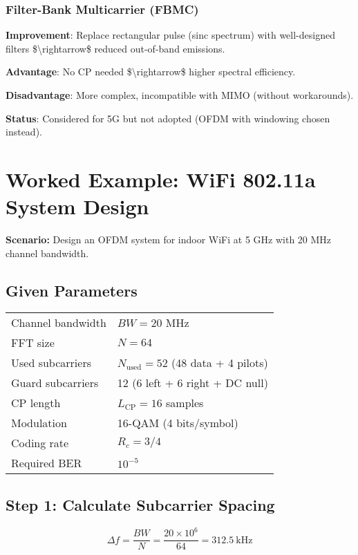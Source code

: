 \subsubsection{Filter-Bank Multicarrier
(FBMC)}\label{filter-bank-multicarrier-fbmc}

\textbf{Improvement}: Replace rectangular pulse (sinc spectrum) with
well-designed filters \$\textbackslash rightarrow\$ reduced out-of-band
emissions.

\textbf{Advantage}: No CP needed \$\textbackslash rightarrow\$ higher
spectral efficiency.

\textbf{Disadvantage}: More complex, incompatible with MIMO (without
workarounds).

\textbf{Status}: Considered for 5G but not adopted (OFDM with windowing
chosen instead).

\section{Worked Example: WiFi 802.11a System Design}

\textbf{Scenario:} Design an OFDM system for indoor WiFi at 5 GHz with 20 MHz channel bandwidth.

\subsection*{Given Parameters}

\begin{tabular}{@{}ll@{}}
Channel bandwidth & $BW = 20$ MHz \\
FFT size & $N = 64$ \\
Used subcarriers & $N_{\mathrm{used}} = 52$ (48 data + 4 pilots) \\
Guard subcarriers & 12 (6 left + 6 right + DC null) \\
CP length & $L_{\mathrm{CP}} = 16$ samples \\
Modulation & 16-QAM (4 bits/symbol) \\
Coding rate & $R_c = 3/4$ \\
Required BER & $10^{-5}$ \\
\end{tabular}

\subsection*{Step 1: Calculate Subcarrier Spacing}

\begin{equation}
\Delta f = \frac{BW}{N} = \frac{20 \times 10^6}{64} = 312.5\ \text{kHz}
\end{equation}

